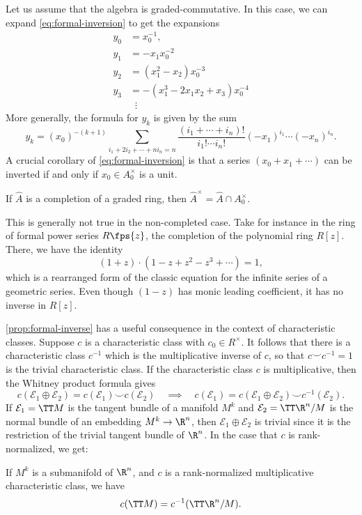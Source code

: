 Let us assume that the algebra is graded-commutative. In this case, we can expand \cref{eq:formal-inversion} to get the expansions
\[
	\begin{aligned}
		y_0 & = x_0^{-1},                        \\
		y_1 & = -x_1x_0^{-2}                     \\
		y_2 & = (x_1^2-x_2)x_0^{-3}              \\
		y_3 & = -(x_1^3 - 2x_1x_2 + x_3)x_0^{-4} \\
		    & \;\;\vdots
	\end{aligned}
\]
More generally, the formula for $y_k$ is given by the sum
\begin{equation}\label{eq:general-formal-inversion}
	y_k = (x_0)^{-(k+1)}\sum_{i_1+2i_2+\cdots+ni_n=n} \frac{(i_1+\cdots+i_n)!}{i_1!\cdots i_n!}(-x_1)^{i_1}\cdots (-x_n)^{i_n}.
\end{equation}
A crucial corollary of \cref{eq:formal-inversion} is that a series $(x_0+x_1+\cdots)$ can be inverted if and only if $x_0\in A_0^\times$ is a unit.

\begin{proposition}\label{prop:formal-inverse}
	If $\widehat{A}$ is a completion of a graded ring, then $\widehat{A}^\times = \widehat{A} \cap A_0^\times$.
\end{proposition}

\begin{remark}
	This is generally not true in the non-completed case. Take for instance in the ring of formal power series $R\fps{z}$, the completion of the polynomial ring $R[z]$. There, we have the identity
	\[
		(1+z)\cdot (1-z+z^2-z^3+\cdots) = 1,
	\]
	which is a rearranged form of the classic equation for the infinite series of a geometric series. Even though $(1-z)$ has monic leading coefficient, it has no inverse in $R[z]$.
\end{remark}

\cref{prop:formal-inverse} has a useful consequence in the context of characteristic classes. Suppose $c$ is a characteristic class with $c_0\in R^\times$. It follows that there is a characteristic class $c^{-1}$ which is the multiplicative inverse of $c$, so that $c\smile c^{-1}=1$ is the trivial characteristic class. If the characteristic class $c$ is multiplicative, then the Whitney product formula gives
\[
	c(\mathcal{E}_1\oplus\mathcal{E}_2)	 = c(\mathcal{E}_1)\smile c(\mathcal{E}_2)
	\quad\implies\quad
	c(\mathcal{E}_1) = c(\mathcal{E}_1\oplus \mathcal{E}_2) \smile c^{-1}(\mathcal{E}_2).
\]
If $\mathcal{E}_1=\TT M$ is the tangent bundle of a manifold $M^k$ and $\mathcal{E}_2=\TT\R^{n}/M$ is the normal bundle of an embedding $M^k\to \R^{n}$, then $\mathcal{E}_1\oplus \mathcal{E}_2$ is trivial since it is the restriction of the trivial tangent bundle of $\R^n$. In the case that $c$ is rank-normalized, we get:
\begin{theorem}\label{thm:whitney-duality}
	If $M^k$ is a submanifold of $\R^n$, and $c$ is a rank-normalized multiplicative characteristic class, we have
	\[
		c(\TT M) = c^{-1}(\TT \R^n/M).
	\]
\end{theorem}

